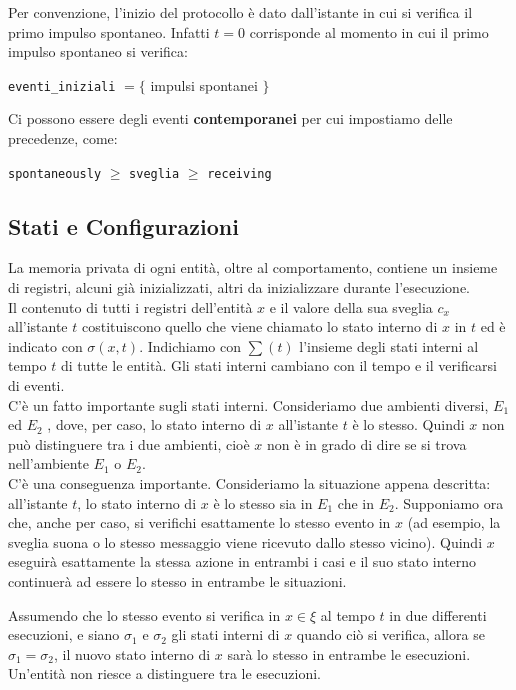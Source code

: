 Per convenzione, l'inizio del protocollo è dato dall'istante in cui si verifica
il primo impulso spontaneo. Infatti $t=0$ corrisponde al momento in cui il primo
impulso spontaneo si verifica:
\begin{center}
    \texttt{eventi\_iniziali} $=\lbrace$ impulsi spontanei $\rbrace$
\end{center}
Ci possono essere degli eventi \textbf{contemporanei} per cui impostiamo delle
precedenze, come:
\begin{center}
    \texttt{spontaneously} $\geq$ \texttt{sveglia} $\geq$ \texttt{receiving}
\end{center}

\subsection{Stati e Configurazioni}
La memoria privata di ogni entità, oltre al comportamento, contiene un insieme
di registri, alcuni già inizializzati, altri da inizializzare durante
l'esecuzione.\\
Il contenuto di tutti i registri dell'entità $x$ e il valore della sua sveglia
$c_x$ all'istante $t$ costituiscono quello che viene chiamato lo stato interno
di $x$ in $t$ ed è indicato con $\sigma (x, t)$. Indichiamo con $\sum(t)$
l'insieme degli stati interni al tempo $t$ di tutte le entità. Gli stati interni
cambiano con il tempo e il verificarsi di eventi.\\
C'è un fatto importante sugli stati interni. Consideriamo due ambienti diversi,
$E_1$ ed $E_2$ , dove, per caso, lo stato interno di $x$ all'istante $t$ è lo
stesso. Quindi $x$ non può distinguere tra i due ambienti, cioè $x$ non è in
grado di dire se si trova nell'ambiente $E_1$ o $E_2$.\\
C'è una conseguenza importante. Consideriamo la situazione appena descritta:
all'istante $t$, lo stato interno di $x$ è lo stesso sia in $E_1$ che in $E_2$.
Supponiamo ora che, anche per caso, si verifichi esattamente lo stesso evento in
$x$ (ad esempio, la sveglia suona o lo stesso messaggio viene ricevuto dallo
stesso vicino). Quindi $x$ eseguirà esattamente la stessa azione in entrambi i
casi e il suo stato interno continuerà ad essere lo stesso in entrambe le
situazioni.

\begin{prop}
    Assumendo che lo stesso evento si verifica in $x \in  \xi$
    al tempo $t$ in due differenti esecuzioni, e siano $\sigma_1$ e $\sigma_2$ gli
    stati interni di $x$ quando ciò si verifica, allora se $\sigma_1 = \sigma_2$,
    il nuovo stato interno di $x$ sarà lo stesso in entrambe le esecuzioni.\\
    Un'entità non riesce a distinguere tra le esecuzioni.
\end{prop}

